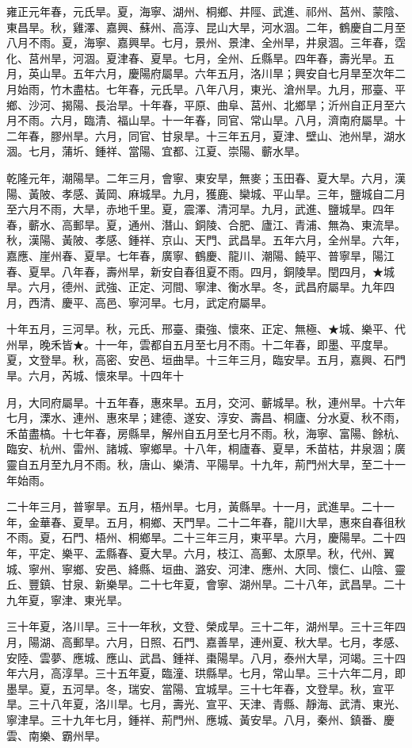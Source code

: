 \begin{pinyinscope}
雍正元年春，元氏旱。夏，海寧、湖州、桐鄉、井陘、武進、祁州、莒州、蒙陰、東昌旱。秋，雞澤、嘉興、蘇州、高淳、昆山大旱，河水涸。二年，鶴慶自二月至八月不雨。夏，海寧、嘉興旱。七月，景州、景津、全州旱，井泉涸。三年春，霑化、莒州旱，河涸。夏津春、夏旱。七月，全州、丘縣旱。四年春，壽光旱。五月，英山旱。五年六月，慶陽府屬旱。六年五月，洛川旱；興安自七月旱至次年二月始雨，竹木盡枯。七年春，元氏旱。八年八月，東光、滄州旱。九月，邢臺、平鄉、沙河、揭陽、長治旱。十年春，平原、曲阜、莒州、北鄉旱；沂州自正月至六月不雨。六月，臨清、福山旱。十一年春，同官、常山旱。八月，濟南府屬旱。十二年春，膠州旱。六月，同官、甘泉旱。十三年五月，夏津、壁山、池州旱，湖水涸。七月，蒲圻、鍾祥、當陽、宜都、江夏、崇陽、蘄水旱。

乾隆元年，潮陽旱。二年三月，會寧、東安旱，無麥；玉田春、夏大旱。六月，漢陽、黃陂、孝感、黃岡、麻城旱。九月，獲鹿、欒城、平山旱。三年，鹽城自二月至六月不雨，大旱，赤地千里。夏，震澤、清河旱。九月，武進、鹽城旱。四年春，蘄水、高郵旱。夏，通州、潛山、銅陵、合肥、廬江、青浦、無為、東流旱。秋，漢陽、黃陂、孝感、鍾祥、京山、天門、武昌旱。五年六月，全州旱。六年，嘉應、崖州春、夏旱。七年春，廣寧、鶴慶、龍川、潮陽、饒平、普寧旱，陽江春、夏旱。八年春，壽州旱，新安自春徂夏不雨。四月，銅陵旱。閏四月，★城旱。六月，德州、武強、正定、河間、寧津、衡水旱。冬，武昌府屬旱。九年四月，西清、慶平、高邑、寧河旱。七月，武定府屬旱。

十年五月，三河旱。秋，元氏、邢臺、棗強、懷來、正定、無極、★城、樂平、代州旱，晚禾皆★。十一年，雲都自五月至七月不雨。十二年春，即墨、平度旱。夏，文登旱。秋，高密、安邑、垣曲旱。十三年三月，臨安旱。五月，嘉興、石門旱。六月，芮城、懷來旱。十四年十

月，大同府屬旱。十五年春，惠來旱。五月，交河、蘄城旱。秋，連州旱。十六年七月，溧水、連州、惠來旱；建德、遂安、淳安、壽昌、桐廬、分水夏、秋不雨，禾苗盡槁。十七年春，房縣旱，解州自五月至七月不雨。秋，海寧、富陽、餘杭、臨安、杭州、雷州、諸城、寧鄉旱。十八年，桐廬春、夏旱，禾苗枯，井泉涸；廣靈自五月至九月不雨。秋，唐山、樂清、平陽旱。十九年，荊門州大旱，至二十一年始雨。

二十年三月，普寧旱。五月，梧州旱。七月，黃縣旱。十一月，武進旱。二十一年，金華春、夏旱。五月，桐鄉、天門旱。二十二年春，龍川大旱，惠來自春徂秋不雨。夏，石門、梧州、桐鄉旱。二十三年三月，東平旱。六月，慶陽旱。二十四年，平定、樂平、盂縣春、夏大旱。六月，枝江、高郵、太原旱。秋，代州、翼城、寧州、寧鄉、安邑、絳縣、垣曲、潞安、河津、應州、大同、懷仁、山陰、靈丘、豐鎮、甘泉、新樂旱。二十七年夏，會寧、湖州旱。二十八年，武昌旱。二十九年夏，寧津、東光旱。

三十年夏，洛川旱。三十一年秋，文登、榮成旱。三十二年，湖州旱。三十三年四月，陽湖、高郵旱。六月，日照、石門、嘉善旱，連州夏、秋大旱。七月，孝感、安陸、雲夢、應城、應山、武昌、鍾祥、棗陽旱。八月，泰州大旱，河竭。三十四年六月，高淳旱。三十五年夏，臨潼、珙縣旱。七月，常山旱。三十六年二月，即墨旱。夏，五河旱。冬，瑞安、當陽、宜城旱。三十七年春，文登旱。秋，宣平旱。三十八年夏，洛川旱。七月，壽光、宣平、天津、青縣、靜海、武清、東光、寧津旱。三十九年七月，鍾祥、荊門州、應城、黃安旱。八月，秦州、鎮番、慶雲、南樂、霸州旱。


\end{pinyinscope}
